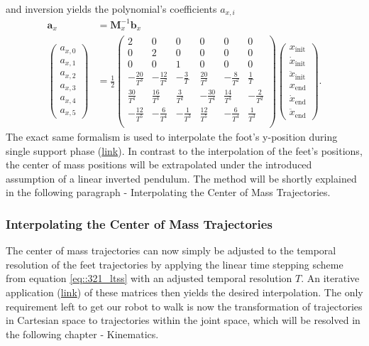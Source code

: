 and inversion yields the polynomial's coefficients $a_{x,i}$
\begin{align}
	\bm{a}_x &= \bm{M}_x^{-1}\bm{b}_x \\
	\begin{pmatrix}
		a_{x,0} \\
		a_{x,1} \\
		a_{x,2} \\
		a_{x,3} \\
		a_{x,4} \\
		a_{x,5}
	\end{pmatrix} &= 
	\frac{1}{2}
	\begin{pmatrix}
		2 & 0 & 0 & 0 & 0 & 0 \\
		0 & 2 & 0 & 0 & 0 & 0 \\
		0 & 0 & 1 & 0 & 0 & 0 \\
		-\frac{20}{T^3} & -\frac{12}{T^2} & -\frac{3}{T} & \frac{20}{T^3} & -\frac{8}{T^2} & \frac{1}{T} \\
		\frac{30}{T^4} & \frac{16}{T^3} & \frac{3}{T^2} & -\frac{30}{T^4} & \frac{14}{T^3} & -\frac{2}{T^2} \\
		-\frac{12}{T^5} & -\frac{6}{T^4} & -\frac{1}{T^3} & \frac{12}{T^5} & -\frac{6}{T^4} & \frac{1}{T^3} \\
	\end{pmatrix}
	\begin{pmatrix}
		x_\text{init} \\
		\dot{x}_\text{init} \\
		\ddot{x}_\text{init} \\
		x_\text{end} \\
		\dot{x}_\text{end} \\
		\ddot{x}_\text{end} 
	\end{pmatrix}.
\end{align}
The exact same formalism is used to interpolate the foot's y-position during single support phase (\href{https://github.com/mhubii/nmpc_pattern_generator/blob/c82c64a28da7527e75442764f585bd50a8f61ee9/libs/pattern_generator/src/interpolation.cpp#L806}{link}). In contrast to the interpolation of the feet's positions, the center of mass positions will be extrapolated under the introduced assumption of a linear inverted pendulum. The method will be shortly explained in the following paragraph - Interpolating the Center of Mass Trajectories.
\subsubsection{Interpolating the Center of Mass Trajectories}
The center of mass trajectories can now simply be adjusted to the temporal resolution of the feet trajectories by applying the linear time stepping scheme from equation \ref{eq::321_ltss} with an adjusted temporal resolution $T$. An iterative application (\href{https://github.com/mhubii/nmpc_pattern_generator/blob/5a213044c927dc6aac9f7e32ce1e5fb472cd67bb/libs/pattern_generator/src/interpolation.cpp#L776}{link}) of these matrices then yields the desired interpolation. The only requirement left to get our robot to walk is now the transformation of trajectories in Cartesian space to trajectories within the joint space, which will be resolved in the following chapter - Kinematics.